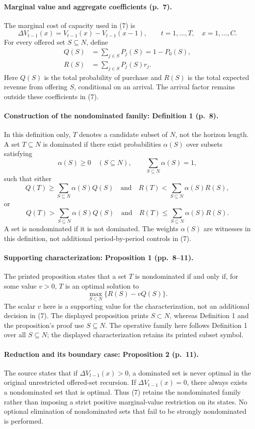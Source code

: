 \documentclass{article}
\begin{document}
\paragraph{Marginal value and aggregate coefficients (p.~7).}
The marginal cost of capacity used in (7) is
\[
\Delta V_{t-1}(x)=V_{t-1}(x)-V_{t-1}(x-1),
\qquad t=1,\ldots,T,\quad x=1,\ldots,C.
\]
For every offered set $S\subseteq N$, define
\begin{align*}
Q(S)&=\sum_{j\in S}P_j(S)=1-P_0(S),\\
R(S)&=\sum_{j\in S}P_j(S)r_j.
\end{align*}
Here $Q(S)$ is the total probability of purchase and $R(S)$ is the total expected revenue from offering $S$, conditional on an arrival. The arrival factor remains outside these coefficients in (7).

\paragraph{Construction of the nondominated family: Definition 1 (p.~8).}
In this definition only, $T$ denotes a candidate subset of $N$, not the horizon length. A set $T\subseteq N$ is dominated if there exist probabilities $\alpha(S)$ over subsets satisfying
\[
\alpha(S)\ge0\quad(S\subseteq N),
\qquad \sum_{S\subseteq N}\alpha(S)=1,
\]
such that either
\[
Q(T)\ge\sum_{S\subseteq N}\alpha(S)Q(S)
\quad\text{and}\quad
R(T)<\sum_{S\subseteq N}\alpha(S)R(S),
\]
or
\[
Q(T)>\sum_{S\subseteq N}\alpha(S)Q(S)
\quad\text{and}\quad
R(T)\le\sum_{S\subseteq N}\alpha(S)R(S).
\]
A set is nondominated if it is not dominated. The weights $\alpha(S)$ are witnesses in this definition, not additional period-by-period controls in (7).

\paragraph{Supporting characterization: Proposition 1 (pp.~8--11).}
The printed proposition states that a set $T$ is nondominated if and only if, for some value $v>0$, $T$ is an optimal solution to
\[
\max_{S\subset N}\{R(S)-vQ(S)\}.
\]
The scalar $v$ here is a supporting value for the characterization, not an additional decision in (7). The displayed proposition prints $S\subset N$, whereas Definition 1 and the proposition's proof use $S\subseteq N$. The operative family here follows Definition 1 over all $S\subseteq N$; the displayed characterization retains its printed subset symbol.

\paragraph{Reduction and its boundary case: Proposition 2 (p.~11).}
The source states that if $\Delta V_{t-1}(x)>0$, a dominated set is never optimal in the original unrestricted offered-set recursion. If $\Delta V_{t-1}(x)=0$, there always exists a nondominated set that is optimal. Thus (7) retains the nondominated family rather than imposing a strict positive marginal-value restriction on its states. No optional elimination of nondominated sets that fail to be strongly nondominated is performed.
\end{document}
